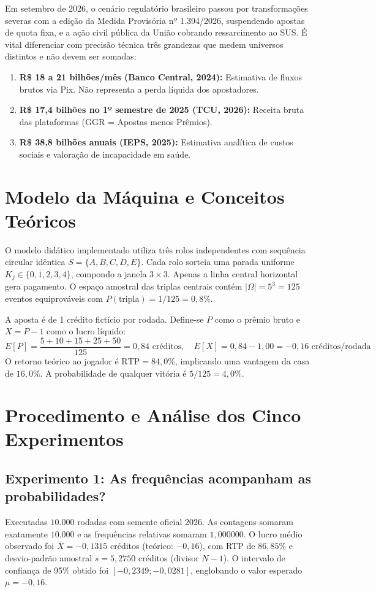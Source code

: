 \documentclass[10pt,a4paper]{article}
\begin{document}
Em setembro de 2026, o cenário regulatório brasileiro passou por transformações severas com a edição da Medida Provisória nº 1.394/2026, suspendendo apostas de quota fixa, e a ação civil pública da União cobrando ressarcimento ao SUS. É vital diferenciar com precisão técnica três grandezas que medem universos distintos e não devem ser somadas:
\begin{enumerate}
    \item \textbf{R\$ 18 a 21 bilhões/mês (Banco Central, 2024):} Estimativa de fluxos brutos via Pix. Não representa a perda líquida dos apostadores.
    \item \textbf{R\$ 17,4 bilhões no 1º semestre de 2025 (TCU, 2026):} Receita bruta das plataformas (GGR = Apostas menos Prêmios).
    \item \textbf{R\$ 38,8 bilhões anuais (IEPS, 2025):} Estimativa analítica de custos sociais e valoração de incapacidade em saúde.
\end{enumerate}

\section{Modelo da Máquina e Conceitos Teóricos}
O modelo didático implementado utiliza três rolos independentes com sequência circular idêntica $S = \{A, B, C, D, E\}$. Cada rolo sorteia uma parada uniforme $K_j \in \{0, 1, 2, 3, 4\}$, compondo a janela $3 \times 3$. Apenas a linha central horizontal gera pagamento. O espaço amostral das triplas centrais contém $|\Omega| = 5^3 = 125$ eventos equiprováveis com $P(\text{tripla}) = 1/125 = 0{,}8\%$.

A aposta é de 1 crédito fictício por rodada. Define-se $P$ como o prêmio bruto e $X = P - 1$ como o lucro líquido:
\begin{equation}
    E[P] = \frac{5 + 10 + 15 + 25 + 50}{125} = 0{,}84 \text{ créditos}, \quad E[X] = 0{,}84 - 1{,}00 = -0{,}16 \text{ créditos/rodada}
\end{equation}
O retorno teórico ao jogador é $\text{RTP} = 84{,}0\%$, implicando uma vantagem da casa de $16{,}0\%$. A probabilidade de qualquer vitória é $5/125 = 4{,}0\%$.

\section{Procedimento e Análise dos Cinco Experimentos}

\subsection{Experimento 1: As frequências acompanham as probabilidades?}
Executadas $10.000$ rodadas com semente oficial 2026. As contagens somaram exatamente $10.000$ e as frequências relativas somaram $1{,}000000$. O lucro médio observado foi $\bar{X} = -0{,}1315$ créditos (teórico: $-0{,}16$), com RTP de $86{,}85\%$ e desvio-padrão amostral $s = 5{,}2750$ créditos (divisor $N-1$). O intervalo de confiança de 95\% obtido foi $[-0{,}2349; -0{,}0281]$, englobando o valor esperado $\mu = -0{,}16$.
\end{document}
